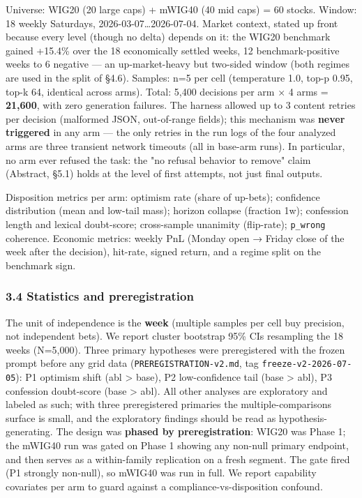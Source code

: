 \documentclass[
  10pt,
]{article}
\begin{document}
Universe: WIG20 (20 large caps) + mWIG40 (40 mid caps) = 60 stocks.
Window: 18 weekly Saturdays, 2026-03-07\ldots2026-07-04. Market context,
stated up front because every level (though no delta) depends on it: the
WIG20 benchmark gained +15.4\% over the 18 economically settled weeks,
12 benchmark-positive weeks to 6 negative --- an up-market-heavy but
two-sided window (both regimes are used in the split of §4.6). Samples:
n=5 per cell (temperature 1.0, top-p 0.95, top-k 64, identical across
arms). Total: 5,400 decisions per arm × 4 arms = \textbf{21,600}, with
zero generation failures. The harness allowed up to 3 content retries
per decision (malformed JSON, out-of-range fields); this mechanism was
\textbf{never triggered} in any arm --- the only retries in the run logs
of the four analyzed arms are three transient network timeouts (all in
base-arm runs). In particular, no arm ever refused the task: the "no
refusal behavior to remove" claim (Abstract, §5.1) holds at the level of
first attempts, not just final outputs.

Disposition metrics per arm: optimism rate (share of up-bets);
confidence distribution (mean and low-tail mass); horizon collapse
(fraction 1w); confession length and lexical doubt-score; cross-sample
unanimity (flip-rate); \texttt{p\_wrong} coherence. Economic metrics:
weekly PnL (Monday open → Friday close of the week after the decision),
hit-rate, signed return, and a regime split on the benchmark sign.

\subsubsection{3.4 Statistics and
preregistration}\label{34-statistics-and-preregistration}

The unit of independence is the \textbf{week} (multiple samples per cell
buy precision, not independent bets). We report cluster bootstrap 95\%
CIs resampling the 18 weeks (N=5,000). Three primary hypotheses were
preregistered with the frozen prompt before any grid data
(\texttt{PREREGISTRATION-v2.md}, tag \texttt{freeze-v2-2026-07-05}): P1
optimism shift (abl \textgreater{} base), P2 low-confidence tail (base
\textgreater{} abl), P3 confession doubt-score (base \textgreater{}
abl). All other analyses are exploratory and labeled as such; with three
preregistered primaries the multiple-comparisons surface is small, and
the exploratory findings should be read as hypothesis-generating. The
design was \textbf{phased by preregistration}: WIG20 was Phase 1; the
mWIG40 run was gated on Phase 1 showing any non-null primary endpoint,
and then serves as a within-family replication on a fresh segment. The
gate fired (P1 strongly non-null), so mWIG40 was run in full. We report
capability covariates per arm to guard against a
compliance-vs-disposition confound.
\end{document}
